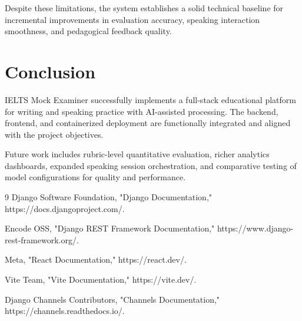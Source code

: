 ﻿\documentclass[conference]{IEEEtran}
\begin{document}
Despite these limitations, the system establishes a solid technical baseline for incremental improvements in evaluation accuracy, speaking interaction smoothness, and pedagogical feedback quality.

\section{Conclusion}
IELTS Mock Examiner successfully implements a full-stack educational platform for writing and speaking practice with AI-assisted processing. The backend, frontend, and containerized deployment are functionally integrated and aligned with the project objectives.

Future work includes rubric-level quantitative evaluation, richer analytics dashboards, expanded speaking session orchestration, and comparative testing of model configurations for quality and performance.

\begin{thebibliography}{9}
Django Software Foundation, "Django Documentation," https://docs.djangoproject.com/.

Encode OSS, "Django REST Framework Documentation," https://www.django-rest-framework.org/.

Meta, "React Documentation," https://react.dev/.

Vite Team, "Vite Documentation," https://vite.dev/.

Django Channels Contributors, "Channels Documentation," https://channels.readthedocs.io/.
\end{thebibliography}
\end{document}
